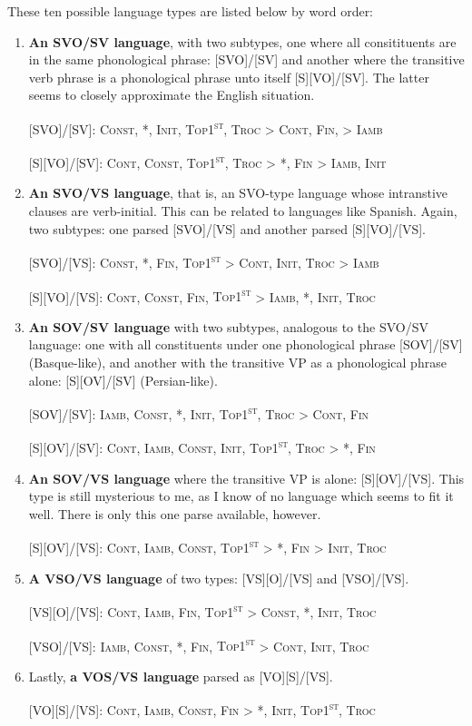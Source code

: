 \documentclass{article}
\newcommand{\cont}{\textsc{Cont}}
\newcommand{\iamb}{\textsc{Iamb}}
\newcommand{\cons}{\textsc{Const}}
\newcommand{\topf}{\textsc{Top1\textsuperscript{st}}}
\newcommand{\nophi}{\textsc{*\textphi}}
\newcommand{\finphi}{\textsc{Fin\textphi}}
\newcommand{\initphi}{\textsc{Init\textphi}}
\newcommand{\troc}{\textsc{Troc}}
\begin{document}
These ten possible language types are listed below by word order:

\begin{enumerate}
\item \textbf{An SVO/SV language}, with two subtypes, one where all consitituents are in the same phonological phrase: [SVO]/[SV] and another where the transitive verb phrase is a phonological phrase unto itself [S][VO]/[SV]. The latter seems to closely approximate the English situation.

[SVO]/[SV]: \cons, \nophi, \initphi, \topf, {\troc} {\textgreater} \cont, {\finphi,} {\textgreater} \iamb

[S][VO]/[SV]: \cont, \cons, \topf, {\troc} {\textgreater} \nophi, {\finphi} {\textgreater} \iamb, \initphi
\item \textbf{An SVO/VS language}, that is, an SVO-type language whose intranstive clauses are verb-initial. This can be related to languages like Spanish. Again, two subtypes: one parsed [SVO]/[VS] and another parsed [S][VO]/[VS].

[SVO]/[VS]: \cons, \nophi, \finphi, {\topf} {\textgreater} \cont, \initphi, {\troc} {\textgreater} \iamb

[S][VO]/[VS]: \cont, \cons, \finphi, {\topf} {\textgreater} \iamb, \nophi, \initphi, \troc
\item \textbf{An SOV/SV language} with two subtypes, analogous to the SVO/SV language: one with all constituents under one phonological phrase [SOV]/[SV] (Basque-like), and another with the transitive VP as a phonological phrase alone: [S][OV]/[SV] (Persian-like).

[SOV]/[SV]: \iamb, \cons, \nophi, \initphi, \topf, {\troc} {\textgreater} \cont, \finphi

[S][OV]/[SV]: \cont, \iamb, \cons, \initphi, \topf, {\troc} {\textgreater} \nophi, \finphi
\item \textbf{An SOV/VS language} where the transitive VP is alone: [S][OV]/[VS]. This type is still mysterious to me, as I know of no language which seems to fit it well. There is only this one parse available, however.

[S][OV]/[VS]: \cont, \iamb, \cons, {\topf} {\textgreater} \nophi, {\finphi} {\textgreater} \initphi, \troc
\item \textbf{A VSO/VS language} of two types: [VS][O]/[VS] and [VSO]/[VS].

[VS][O]/[VS]: \cont, \iamb, \finphi, {\topf} {\textgreater} \cons, \nophi, \initphi, \troc

[VSO]/[VS]: \iamb, \cons, \nophi, \finphi, {\topf} {\textgreater} \cont, \initphi, \troc
\item Lastly, \textbf{a VOS/VS language} parsed as [VO][S]/[VS].

[VO][S]/[VS]: \cont, \iamb, \cons, {\finphi} {\textgreater} \nophi, \initphi, \topf, \troc

\end{enumerate}
\end{document}
